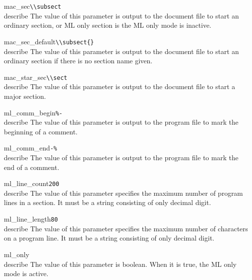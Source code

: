 \begin{describepara}{mac_sec}{\verb*|\\subsect|}\\describe
The value of this parameter is output to the document file to start an
ordinary section, or ML only section is the ML only mode is inactive.
\end{describepara}
\begin{describepara}{mac_sec_default}{\verb*|\\subsect{}|}\\describe
The value of this parameter is output to the document file to start an
ordinary section if there is no section name given.
\end{describepara}
\begin{describepara}{mac_star_sec}{\verb*|\\sect|}\\describe
The value of this parameter is output to the document file to start a
major section.
\end{describepara}
\begin{describepara}{ml_comm_begin}{\verb*|%-|}\\describe
The value of this parameter is output to the program file to mark the
beginning of a comment.
\end{describepara}
\begin{describepara}{ml_comm_end}{\verb*|-%|}\\describe
The value of this parameter is output to the program file to mark the
end of a comment.
\end{describepara}
\begin{describepara}{ml_line_count}{\verb*|200|}\\describe
The value of this parameter specifies the maximum number of program
lines in a section. It must be a string consisting of only decimal digit.
\end{describepara}
\begin{describepara}{ml_line_length}{\verb*|80|}\\describe
The value of this parameter specifies the maximum number of characters
on a program line. It must be a string consisting of only decimal digit.
\end{describepara}
\begin{describepara}{ml_only}{\verb*||}\\describe
The value of this parameter is boolean. When it is true, the ML
only mode is active.
\end{describepara}
